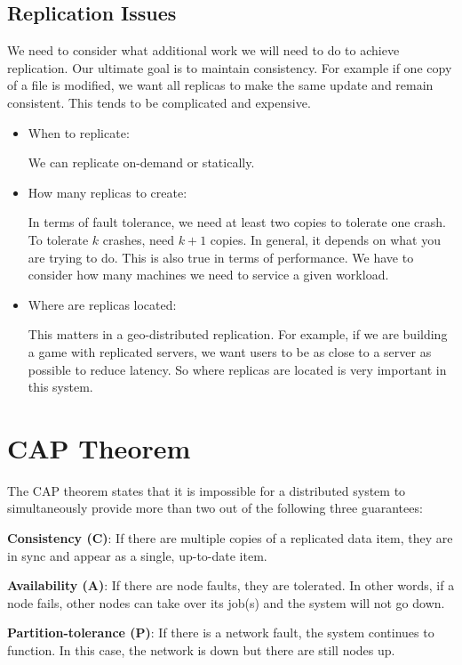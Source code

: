 \documentclass[twoside]{article}
\begin{document}
\subsection{Replication Issues}

We need to consider what additional work we will need to do to achieve replication. Our ultimate goal is to maintain consistency. For example if one copy of a file is modified, we want all replicas to make the same update and remain consistent. This tends to be complicated and expensive.

\begin{itemize}

    \item When to replicate:
    
    We can replicate on-demand or statically.
    
    \item How many replicas to create:
    
    In terms of fault tolerance, we need at least two copies to tolerate one crash. To tolerate $k$ crashes, need $k + 1$ copies. In general, it depends on what you are trying to do. This is also true in terms of performance. We have to consider how many machines we need to service a given workload.
    
    \item Where are replicas located:
    
    This matters in a geo-distributed replication. For example, if we are building a game with replicated servers, we want users to be as close to a server as possible to reduce latency. So where replicas are located is very important in this system.

\end{itemize}

\section{CAP Theorem}

The CAP theorem states that it is impossible for a distributed system to simultaneously provide more than two out of the following three guarantees:

\begin{description}

    \item \textbf{Consistency (C)}: If there are multiple copies of a replicated data item, they are in sync and appear as a single, up-to-date item.
    
    \item \textbf{Availability (A)}: If there are node faults, they are tolerated. In other words, if a node fails, other nodes can take over its job(s) and the system will not go down.
    
    \item \textbf{Partition-tolerance (P)}: If there is a network fault, the system continues to function. In this case, the network is down but there are still nodes up.

\end{description}
\end{document}
